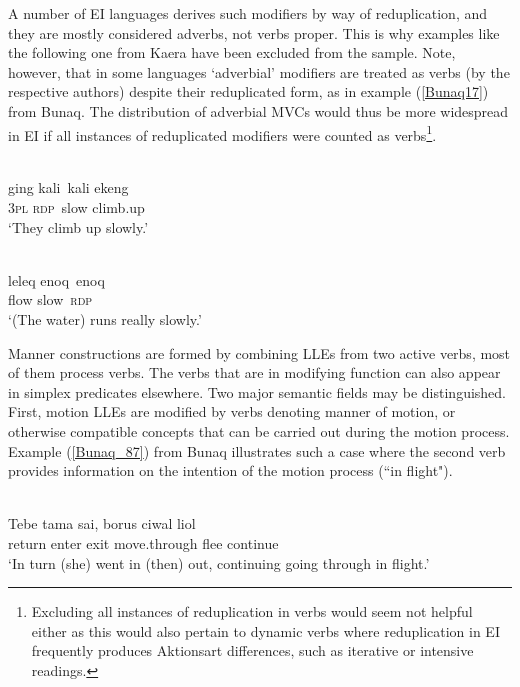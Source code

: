 A number of EI languages derives such modifiers by way of reduplication, and they are mostly considered adverbs, not verbs proper. This is why examples like the following one from Kaera have been excluded from the sample. Note, however, that in some languages `adverbial' modifiers are treated as verbs (by the respective authors) despite their reduplicated form, as in example (\ref{Bunaq17}) from Bunaq. The distribution of adverbial MVCs would thus be more widespread in EI if all instances of reduplicated modifiers were counted as verbs\footnote{Excluding all instances of reduplication in verbs would seem not helpful either as this would also pertain to dynamic verbs where reduplication in EI frequently produces Aktionsart differences, such as iterative or intensive readings.}.

\ea \label{}
\\
\gll ging kali~kali ekeng \\
3\textsc{pl} \textsc{rdp}~slow climb.up \\
\glft `They climb up slowly.'\\ 
\z

\ea \label{Bunaq17}
\\
\gll leleq enoq~enoq \\
flow slow~\textsc{rdp} \\
\glft `(The water) runs really slowly.'\\ 
\z

Manner constructions are formed by combining LLEs from two active verbs, most of them process verbs. The verbs that are in modifying function can also appear in simplex predicates elsewhere. Two major semantic fields may be distinguished. First, motion LLEs are modified by verbs denoting manner of motion, or otherwise compatible concepts that can be carried out during the motion process. Example (\ref{Bunaq_87}) from Bunaq illustrates such a case where the second verb provides information on the intention of the motion process (``in flight"). 

\ea \label{Bunaq_87}
\\
\gll Tebe tama sai, borus ciwal liol \\
return enter exit move.through flee continue \\
\glft `In turn (she) went in (then) out, continuing going through in flight.’\\ 
\z

